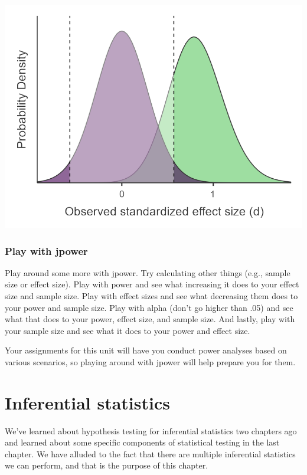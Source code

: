 \documentclass[
]{book}
\begin{document}
\includegraphics[width=5.55208in,height=\textheight]{images/05-bean/power-demo.png}

\hypertarget{play-with-jpower}{%
\subsection{Play with jpower}\label{play-with-jpower}}

Play around some more with jpower. Try calculating other things (e.g., sample size or effect size). Play with power and see what increasing it does to your effect size and sample size. Play with effect sizes and see what decreasing them does to your power and sample size. Play with alpha (don't go higher than .05) and see what that does to your power, effect size, and sample size. And lastly, play with your sample size and see what it does to your power and effect size.

Your assignments for this unit will have you conduct power analyses based on various scenarios, so playing around with jpower will help prepare you for them.

\hypertarget{inferential-statistics}{%
\chapter{Inferential statistics}\label{inferential-statistics}}

We've learned about hypothesis testing for inferential statistics two chapters ago and learned about some specific components of statistical testing in the last chapter. We have alluded to the fact that there are multiple inferential statistics we can perform, and that is the purpose of this chapter.
\end{document}

